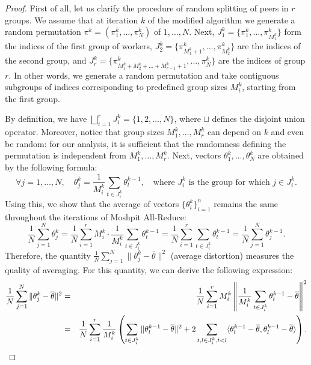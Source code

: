 \begin{proof}
First of all, let us clarify the procedure of random splitting of peers in $r$ groups. We assume that at iteration $k$ of the modified algorithm we generate a random permutation $\pi^k = (\pi_1^k,\ldots,\pi_N^k)$ of $1,\ldots, N$. Next, $J_1^k = \{\pi_1^k,\ldots,\pi_{M_1^k}^k\}$ form the indices of the first group of workers, $J_2^k = \{\pi_{M_1^k+1}^k,\ldots,\pi_{M_2^k}^k\}$ are the indices of the second group, and $J_r^k = \{\pi_{M_1^k+M_2^k+\ldots+M_{r-1}^k+1}^k,\ldots,\pi_{N}^k\}$ are the indices of group $r$. In other words, we generate a random permutation and take contiguous subgroups of indices corresponding to predefined group sizes $M_i^k$, starting from the first group.

By definition, we have $\bigsqcup_{i=1}^r J_i^k = \{1,2,\ldots,N\}$, where $\sqcup$ defines the disjoint union operator. Moreover, notice that group sizes $M_1^k,\ldots,M_r^k$ can depend on $k$ and even be random: for our analysis, it is sufficient that the randomness defining the permutation is independent from $M_1^k,\ldots,M_r^k$. Next, vectors $\theta_1^k,\ldots,\theta_N^k$ are obtained by the following formula:
\begin{equation*}
    \forall j=1,\ldots,N,\quad \theta_j^k = \frac{1}{M_i^k}\sum\limits_{t\in J_i^k}\theta_t^{k-1},\quad \text{where } J_i^k \text{ is the group for which } j\in J_i^k.
\end{equation*}
Using this, we show that the average of vectors $\{\theta_i^k\}_{i=1}^n$ remains the same throughout the iterations of Moshpit All-Reduce:
\begin{equation*}
    \frac{1}{N}\sum\limits_{j=1}^N\theta_j^k = \frac{1}{N}\sum\limits_{i=1}^rM_i^k\cdot\frac{1}{M_i^k}\sum\limits_{t\in J_i^k}\theta_t^{k-1} = \frac{1}{N}\sum\limits_{i=1}^r\sum\limits_{t\in J_i^k}\theta_t^{k-1} = \frac{1}{N}\sum\limits_{j=1}^N\theta_j^{k-1}.
\end{equation*}
Therefore, the quantity $\frac{1}{N}\sum_{j=1}^N\|\theta_j^k - \overline{\theta}\|^2$ (average distortion) measures the quality of averaging. For this quantity, we can derive the following expression:
\begin{eqnarray}
    \frac{1}{N}\sum\limits_{j=1}^N\|\theta_j^k - \overline{\theta}\|^2 &=& \frac{1}{N}\sum\limits_{i=1}^r M_i^k\left\|\frac{1}{M_i^k}\sum\limits_{t\in J_i^k}\theta_t^{k-1} - \overline{\theta}\right\|^2\notag\\
    &=& \frac{1}{N}\sum\limits_{i=1}^r\frac{1}{M_i^k}\left(\sum\limits_{t\in J_i^k}\|\theta_t^{k-1} - \overline{\theta}\|^2 + 2\sum\limits_{t,l\in J_i^k, t < l}\langle \theta_t^{k-1} - \overline{\theta}, \theta_l^{k-1} - \overline{\theta} \rangle\right).\notag

\end{eqnarray}
\end{proof}
